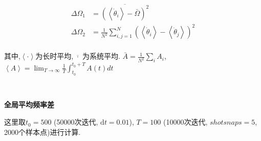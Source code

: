 \documentclass{article}
\begin{document}
$$
\begin{aligned}
	\Delta \Omega _1&=\overline{\left( \left< \dot{\theta}_i \right> -\bar{\Omega} \right) ^2}\\
	\Delta \Omega _2&=\frac{1}{N^2}\sum_{i,j=1}^N{\left( \left< \dot{\theta}_i \right> -\left< \dot{\theta}_j \right> \right) ^2}\\
\end{aligned}
$$

其中,$\left< \cdot \right>$为长时平均,$\overline{\,\,\cdot \,\,}$为系统平均. $\bar{A}=\frac{1}{N^2}\sum\nolimits_i^{}{A_i}$, $\left< A \right> =\lim_{T\rightarrow \infty} \frac{1}{T}\int_{t_0}^{t_0+T}{A\left( t \right) dt}$

$ $

\noindent\textbf{全局平均频率差}

这里取$t_0=500$ (50000次迭代, $\mathrm{d}t=0.01$), $T=100$ (10000次迭代, $shotsnaps=5$, 2000个样本点)进行计算.
\end{document}

